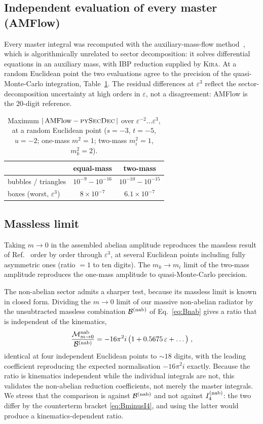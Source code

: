 \documentclass[11pt,a4paper]{article}
\newcommand{\eps}{\varepsilon}
\begin{document}
\subsection{Independent evaluation of every master (AMFlow)}
Every master integral was recomputed with the auxiliary-mass-flow
method~\cite{AMFlow}, which is algorithmically unrelated to sector decomposition:
it solves differential equations in an auxiliary mass, with IBP reduction
supplied by \textsc{Kira}. At a random Euclidean point the two evaluations agree
to the precision of the quasi-Monte-Carlo integration,
Table~\ref{tab:amflow}. The residual differences at $\eps^{3}$ reflect the
sector-decomposition uncertainty at high orders in $\eps$, not a disagreement:
AMFlow is the $20$-digit reference.

\begin{table}[t]
\centering
\caption{Maximum $|\,\text{AMFlow}-\textsc{pySecDec}\,|$ over
$\eps^{-2}\dots\eps^{3}$, at a random Euclidean point
($s=-3$, $t=-5$, $u=-2$; one-mass $m^2=1$; two-mass $m_i^2=1$, $m_k^2=2$).}
\label{tab:amflow}
\begin{tabular}{lcc}
\toprule
 & equal-mass & two-mass \\
\midrule
bubbles / triangles      & $10^{-9}\!-\!10^{-16}$ & $10^{-10}\!-\!10^{-15}$\\
boxes (worst, $\eps^3$)  & $8\times10^{-7}$       & $6.1\times10^{-7}$\\
\bottomrule
\end{tabular}
\end{table}

\subsection{Massless limit}
Taking $m\to0$ in the assembled abelian amplitude reproduces the massless result
of Ref.~\cite{Campbell:2025} order by order through $\eps^{3}$, at several
Euclidean points including fully asymmetric ones (ratio $=1$ to ten digits). The
$m_k\to m_i$ limit of the two-mass amplitude reproduces the one-mass amplitude to
quasi-Monte-Carlo precision.

The non-abelian sector admits a sharper test, because its massless limit is known
in closed form. Dividing the $m\to0$ limit of our massive non-abelian radiator by
the unsubtracted massless combination $\mathcal{B}^{\rm(nab)}$ of
Eq.~\eqref{eq:Bnab} gives a ratio that is  {independent of the kinematics},
\begin{equation}
  \frac{\mathcal{M}^{\rm nab}_{m\to0}}{\mathcal{B}^{\rm(nab)}}
  =-16\pi^2 i\,\big(1+0.5675\,\eps+\dots\big)\;,
  \label{eq:nabratio}
\end{equation}
identical at four independent Euclidean points to $\sim\!18$ digits, with the
leading coefficient reproducing the expected normalisation $-16\pi^2 i$ exactly.
Because the ratio is kinematics independent while the individual integrals are
not, this validates the non-abelian reduction coefficients, not merely the master
integrals. We stress that the comparison is against $\mathcal{B}^{\rm(nab)}$ and
not against $I_4^{\rm(nab)}$: the two differ by the counterterm bracket
\eqref{eq:BminusI4}, and using the latter would produce a kinematics-dependent
ratio.
\end{document}
